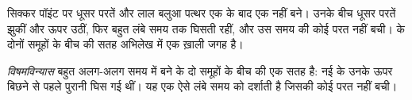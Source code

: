 सिक्कर पॉइंट पर धूसर परतें और लाल बलुआ पत्थर एक के बाद एक नहीं बने। उनके बीच धूसर
परतें झुकीं और ऊपर उठीं, फिर बहुत लंबे समय तक घिसती रहीं, और उस समय की कोई परत
नहीं बची।  के दोनों समूहों के बीच की सतह अभिलेख में एक ख़ाली
जगह है।

\begin{definition}[विषमविन्यास]\label{def:g7:geological-time:unconformity}
\emph{विषमविन्यास} बहुत अलग-अलग समय में बने  के दो
समूहों के बीच की एक  सतह है: नई  के उनके ऊपर बिछने से पहले पुरानी
 घिस गई थीं। यह एक ऐसे लंबे समय को दर्शाती है जिसकी कोई परत नहीं
बची।
\end{definition}

